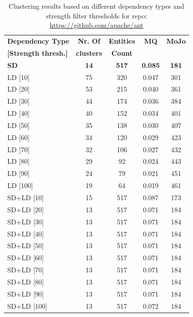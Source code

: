 \documentclass{ieeeaccess}
\begin{document}
\begin{table}
\caption{Clustering results based on different dependency types and strength filter thresholds for repo: \url{https://github.com/apache/ant}}
\label{tab:clustering_results_ant}
\centering
\setlength{\tabcolsep}{3pt}
\begin{tabular}{|l|c|c|c|c|}
\hline
\textbf{Dependency Type} & \textbf{Nr. Of} & \textbf{Entities} & \textbf{MQ} & \textbf{MoJo} \\
\textbf{[Strength thresh.]} & \textbf{clusters} & \textbf{Count} &  &  \\
\hline
\textbf{SD} & \textbf{14} & \textbf{517} & \textbf{0.085} & \textbf{181} \\
\hline
LD [10] & 75 & 320 & 0.047 & 301 \\
LD [20] & 53 & 215 & 0.040 & 361 \\
LD [30] & 44 & 174 & 0.036 & 384 \\
LD [40] & 40 & 152 & 0.034 & 401 \\
LD [50] & 35 & 138 & 0.030 & 407 \\
LD [60] & 34 & 120 & 0.029 & 423 \\
LD [70] & 32 & 106 & 0.027 & 432 \\
LD [80] & 29 & 92 & 0.024 & 443 \\
LD [90] & 24 & 79 & 0.021 & 451 \\
LD [100] & 19 & 64 & 0.019 & 461 \\
\hline
SD+LD [10] & 15 & 517 & 0.087 & 173 \\
SD+LD [20] & 13 & 517 & 0.071 & 184 \\
SD+LD [30] & 13 & 517 & 0.071 & 184 \\
SD+LD [40] & 13 & 517 & 0.071 & 184 \\
SD+LD [50] & 13 & 517 & 0.071 & 184 \\
SD+LD [60] & 13 & 517 & 0.071 & 184 \\
SD+LD [70] & 13 & 517 & 0.071 & 184 \\
SD+LD [80] & 13 & 517 & 0.071 & 184 \\
SD+LD [90] & 13 & 517 & 0.071 & 184 \\
SD+LD [100] & 13 & 517 & 0.072 & 184 \\
\hline
\end{tabular}
\end{table}
\end{document}
